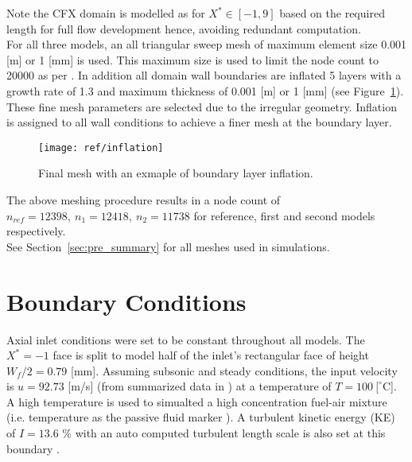 Note the CFX domain is modelled as for $X^* \in [-1,9]$ based on the required length for full flow development \cite{art} hence, avoiding redundant computation.\\


For all three models, an all triangular sweep mesh of maximum element size 0.001 [m] or 1 [mm] is used. This maximum size is used to limit the node count to 20000 as per  \cite{proj}. In addition all domain wall boundaries are inflated 5 layers with a growth rate of 1.3 and maximum thickness of 0.001 [m] or 1 [mm] (see Figure~\ref{fig:inflation}). These fine mesh parameters are selected due to the irregular geometry. Inflation is assigned to all wall conditions to achieve a finer mesh at the boundary layer.

\begin{figure}[H]
	\centering
	\texttt{[image: ref/inflation]}
	\caption[Final mesh with an exmaple of boundary layer inflation.]{Final mesh with an exmaple of  boundary layer inflation.\cite{cfx}}
	\label{fig:inflation}
\end{figure}

The above meshing procedure results in a node count of $n_{ref}= 12398,\ n_1= 12418,\ n_2=11738$ for reference, first and second models respectively.\\

See Section~\ref{sec:pre_summary} for all meshes used in \cite{cfx} simulations.

\section{Boundary Conditions}
\label{sec:pre_bc}

Axial inlet conditions were set to be constant throughout all models. The $X^*=-1$ face is split to model half of the inlet's rectangular face of height $W_f/2=0.79$ [mm]. Assuming subsonic and steady conditions, the input velocity is $u=92.73$ [m/s] (from summarized \cite{art} data in \cite{projfaq}) at a temperature of $T=100\ [ ^{\circ}$C]. A high temperature is used to simualted a high concentration fuel-air mixture (i.e. temperature as the passive fluid marker \cite{proj}). A turbulent kinetic energy (KE) of $I=13.6$ \% with an auto computed turbulent length scale is also set at this boundary \cite{projfaq}.\\

